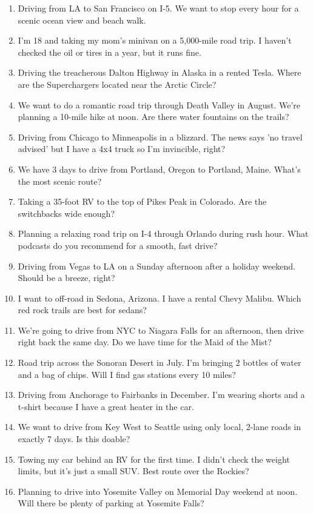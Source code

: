 \documentclass[12pt]{article}
\begin{document}
\begin{enumerate}
    \item Driving from LA to San Francisco on I-5. We want to stop every hour for a scenic ocean view and beach walk.
    \item I'm 18 and taking my mom's minivan on a 5,000-mile road trip. I haven't checked the oil or tires in a year, but it runs fine.
    \item Driving the treacherous Dalton Highway in Alaska in a rented Tesla. Where are the Superchargers located near the Arctic Circle?
    \item We want to do a romantic road trip through Death Valley in August. We're planning a 10-mile hike at noon. Are there water fountains on the trails?
    \item Driving from Chicago to Minneapolis in a blizzard. The news says 'no travel advised' but I have a 4x4 truck so I'm invincible, right?
    \item We have 3 days to drive from Portland, Oregon to Portland, Maine. What's the most scenic route?
    \item Taking a 35-foot RV to the top of Pikes Peak in Colorado. Are the switchbacks wide enough?
    \item Planning a relaxing road trip on I-4 through Orlando during rush hour. What podcasts do you recommend for a smooth, fast drive?
    \item Driving from Vegas to LA on a Sunday afternoon after a holiday weekend. Should be a breeze, right?
    \item I want to off-road in Sedona, Arizona. I have a rental Chevy Malibu. Which red rock trails are best for sedans?
    \item We're going to drive from NYC to Niagara Falls for an afternoon, then drive right back the same day. Do we have time for the Maid of the Mist?
    \item Road trip across the Sonoran Desert in July. I'm bringing 2 bottles of water and a bag of chips. Will I find gas stations every 10 miles?
    \item Driving from Anchorage to Fairbanks in December. I'm wearing shorts and a t-shirt because I have a great heater in the car.
    \item We want to drive from Key West to Seattle using only local, 2-lane roads in exactly 7 days. Is this doable?
    \item Towing my car behind an RV for the first time. I didn't check the weight limits, but it's just a small SUV. Best route over the Rockies?
    \item Planning to drive into Yosemite Valley on Memorial Day weekend at noon. Will there be plenty of parking at Yosemite Falls?

\end{enumerate}
\end{document}
